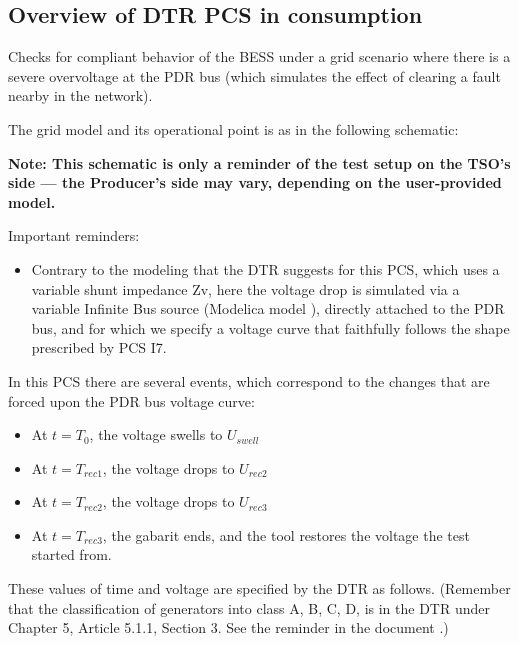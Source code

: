     \subsection{Overview of DTR PCS \DTRPcs{} in consumption}

    Checks for compliant behavior of the BESS under a grid scenario where
    there is a severe overvoltage at the PDR bus (which simulates the
    effect of clearing a fault nearby in the network).

    The grid model and its operational point is as in the following schematic:
    \begin{center}
        
    \end{center}
    \begin{center}
        \small \textbf{Note: This schematic is only a reminder of the test setup on the TSO's
        side --- the Producer's side may vary, depending on the user-provided model.}
    \end{center}

    \noindent Important reminders:
    \begin{itemize}
        \item Contrary to the modeling that the DTR suggests for this PCS, which uses a
        variable shunt impedance Zv, here the voltage drop is simulated via a variable
        Infinite Bus source (Modelica model ), directly
        attached to the PDR bus, and for which we specify a voltage curve that
        faithfully follows the shape prescribed by PCS I7.
    \end{itemize}

    In this PCS there are several events, which correspond to the changes that are
    forced upon the PDR bus voltage curve:
    \begin{itemize}
        \item At $t = T_{0}$, the voltage swells to $U_{swell}$
        \item At $t = T_{rec1}$, the voltage drops to $U_{rec2}$
        \item At $t = T_{rec2}$, the voltage drops to $U_{rec3}$
        \item At $t = T_{rec3}$, the gabarit ends, and the tool restores the
        voltage the test started from.
    \end{itemize}
    These values of time and voltage are specified by the DTR as follows. (Remember
    that the classification of generators into class A, B, C, D, is in the DTR under
    Chapter 5, Article 5.1.1, Section 3. See the reminder in the document
    .)

